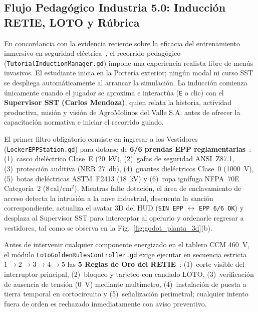 \subsection{Flujo Pedagógico Industria 5.0: Inducción RETIE, LOTO y Rúbrica}\label{subsec:flujo_pedagogico}

En concordancia con la evidencia reciente sobre la eficacia del entrenamiento inmersivo en seguridad eléctrica~\cite{Stefan2023,Stefan2024}, el recorrido pedagógico (\texttt{Tutorial\allowbreak Induction\allowbreak Manager.gd}) impone una experiencia realista libre de menús invasivos. El estudiante inicia en la Portería exterior; ningún modal ni curso SST se despliega automáticamente al arrancar la simulación. La inducción comienza únicamente cuando el jugador se aproxima e interactúa (\texttt{E} o clic) con el \textbf{Supervisor SST (Carlos Mendoza)}, quien relata la historia, actividad productiva, misión y visión de AgroMolinos del Valle S.A. antes de ofrecer la capacitación normativa e iniciar el recorrido guiado.

El primer filtro obligatorio consiste en ingresar a los Vestidores (\texttt{Locker\allowbreak EPP\allowbreak Station.gd}) para dotarse de \textbf{6/6 prendas EPP reglamentarias}~\cite{RETIE2026,NFPA70E,OSHA1910}: (1)~casco dieléctrico Clase~E (\qty{20}{\kilo\volt}), (2)~gafas de seguridad ANSI~Z87.1, (3)~protección auditiva (NRR \qty{27}{\decibel}), (4)~guantes dieléctricos Clase~0 (\qty{1000}{\volt}), (5)~botas dieléctricas ASTM~F2413 (\qty{18}{\kilo\volt}) y (6)~ropa ignífuga NFPA~70E Categoría~2 ($8\,\mathrm{cal/cm^2}$). Mientras falte dotación, el área de enclavamiento de acceso detecta la intrusión a la nave industrial, descuenta la sanción correspondiente, actualiza el avatar 3D del HUD (\texttt{SIN EPP} $\leftrightarrow$ \texttt{EPP 6/6 OK}) y desplaza al Supervisor SST para interceptar al operario y ordenarle regresar a vestidores, tal como se observa en la Fig.~\ref{fig:godot_planta_3d}(b).

Antes de intervenir cualquier componente energizado en el tablero CCM \qty{460}{\volt}, el módulo \texttt{Loto\allowbreak Golden\allowbreak Rules\allowbreak Controller.gd} exige ejecutar en secuencia estricta $1\to 2\to 3\to 4\to 5$ las \textbf{5 Reglas de Oro del RETIE}~\cite{RETIE2026,Res5018}: (1)~corte visible del interruptor principal, (2)~bloqueo y tarjeteo con candado LOTO, (3)~verificación de ausencia de tensión (\qty{0}{\volt}) mediante multímetro, (4)~instalación de puesta a tierra temporal en cortocircuito y (5)~señalización perimetral; cualquier intento fuera de orden es rechazado inmediatamente con aviso preventivo.

